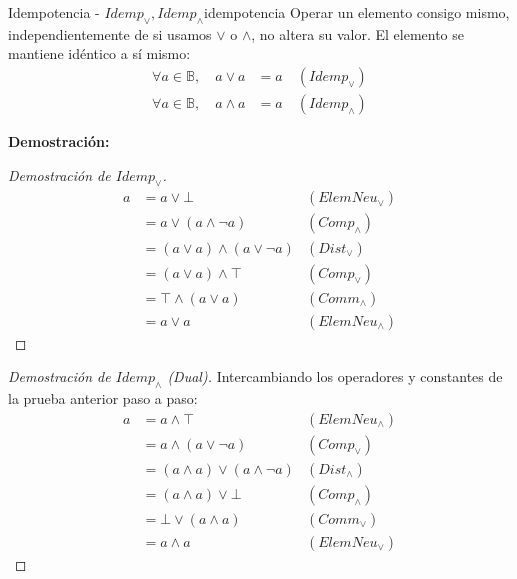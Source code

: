 \documentclass[12pt,a4paper]{article}
\newcommand{\desplegable}[2]{%
  \par\vspace{1ex}\noindent
  \textbf{Demostración:}
  \vspace{1ex}
  
  #2
  \par\vspace{1ex}
}
\begin{document}
\begin{teorema}{Idempotencia - $Idemp_\vee, Idemp_\wedge$}{idempotencia}
Operar un elemento consigo mismo, independientemente de si usamos $\vee$ o $\wedge$, no altera su valor. El elemento se mantiene idéntico a sí mismo:
\begin{align*}
    \forall a \in \mathbb{B}, \quad a \vee a &= a \quad (Idemp_\vee) \\
    \forall a \in \mathbb{B}, \quad a \wedge a &= a \quad (Idemp_\wedge)
\end{align*}
\end{teorema}
\desplegable{proof_idemp}{
\begin{proof}[Demostración de $Idemp_\vee$]
\begin{align*}
    a &= a \vee \bot & (ElemNeu_\vee) \\
      &= a \vee (a \wedge \neg a) & (Comp_\wedge) \\
      &= (a \vee a) \wedge (a \vee \neg a) & (Dist_\vee) \\
      &= (a \vee a) \wedge \top & (Comp_\vee) \\
      &= \top \wedge (a \vee a) & (Comm_\wedge) \\
      &= a \vee a & (ElemNeu_\wedge)
\end{align*}
\end{proof}
\begin{proof}[Demostración de $Idemp_\wedge$ (Dual)]
Intercambiando los operadores y constantes de la prueba anterior paso a paso:
\begin{align*}
    a &= a \wedge \top & (ElemNeu_\wedge) \\
      &= a \wedge (a \vee \neg a) & (Comp_\vee) \\
      &= (a \wedge a) \vee (a \wedge \neg a) & (Dist_\wedge) \\
      &= (a \wedge a) \vee \bot & (Comp_\wedge) \\
      &= \bot \vee (a \wedge a) & (Comm_\vee) \\
      &= a \wedge a & (ElemNeu_\vee)
\end{align*}
\end{proof}
}
\end{document}
